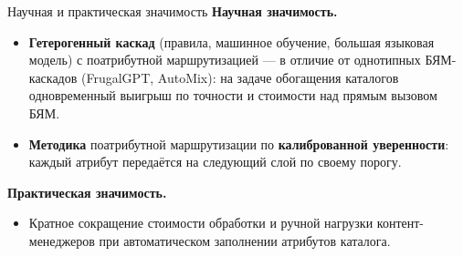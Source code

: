\documentclass[aspectratio=169, 14pt]{beamer}
\begin{document}
\begin{frame}{Научная и практическая значимость}
\fontsize{10pt}{12.5pt}\selectfont
\textbf{Научная значимость.}
\begin{itemize}
    \setlength{\itemsep}{0.2em}
    \item \textbf{Гетерогенный каскад} (правила, машинное обучение, большая
          языковая модель) с поатрибутной маршрутизацией --- в отличие от
          однотипных БЯМ-каскадов (FrugalGPT, AutoMix): на задаче обогащения
          каталогов одновременный выигрыш по точности и стоимости над прямым
          вызовом БЯМ.
    \item \textbf{Методика} поатрибутной маршрутизации по \textbf{калиброванной
          уверенности}: каждый атрибут передаётся на следующий слой по своему
          порогу.
\end{itemize}

\vspace{0.5em}
\textbf{Практическая значимость.}
\begin{itemize}
    \setlength{\itemsep}{0.2em}
    \item Кратное сокращение стоимости обработки и ручной нагрузки
          контент-менеджеров при автоматическом заполнении атрибутов каталога.
\end{itemize}
\end{frame}

\end{document}
